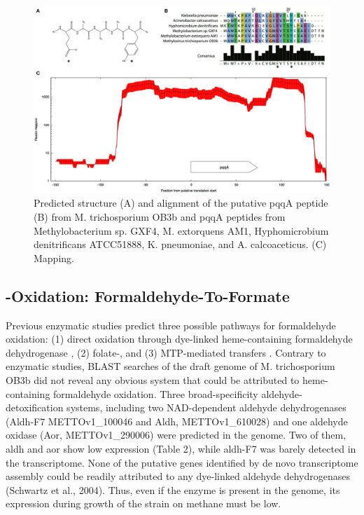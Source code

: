 \begin{figure}[H]
\centering
     \includegraphics[width=1.0\textwidth]{./tex/chapter1/figures/figure2.png}
     \begin{singlespace}
     \caption{Predicted structure
        (A) and alignment of the putative pqqA peptide
        (B) from M. trichosporium OB3b and pqqA peptides from Methylobacterium sp. GXF4, M. extorquens AM1,
            Hyphomicrobium denitrificans ATCC51888, K. pneumoniae, and A. calcoaceticus.
        (C) Mapping.}
     \end{singlespace}
     \label{fig:B_pqqA}
\end{figure}


\subsection{-Oxidation: Formaldehyde-To-Formate}
Previous enzymatic studies predict three possible pathways for formaldehyde oxidation: (1) direct oxidation through dye-linked heme-containing formaldehyde dehydrogenase \cite{patel1980}, (2) folate-, and (3) MTP-mediated  transfers \cite{vorholt1999, doronina2008}.
Contrary to enzymatic studies, BLAST searches of the draft genome of M. trichosporium OB3b did not reveal any obvious system that could be attributed to heme-containing formaldehyde oxidation.
Three broad-specificity aldehyde-detoxification systems, including two NAD-dependent aldehyde dehydrogenases (Aldh-F7 METTOv1\_100046 and Aldh, METTOv1\_610028) and one aldehyde oxidase (Aor, METTOv1\_290006) were predicted in the genome.
Two of them, aldh and aor show low expression (Table 2), while aldh-F7 was barely detected in the transcriptome.
None of the putative genes identified by de novo transcriptome assembly could be readily attributed to any dye-linked aldehyde dehydrogenases (Schwartz et al., 2004).
Thus, even if the enzyme is present in the genome, its expression during growth of the strain on methane must be low.

